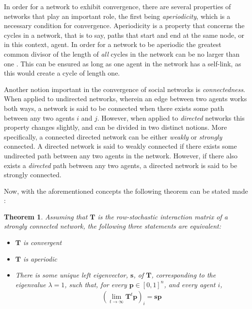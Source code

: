 \documentclass[a4paper, 12pt]{report}
\newtheorem{theorem}{Theorem}
\newcommand{\T}{\bm{T}}
\begin{document}
\noindent In order for a network to exhibit convergence, there are several properties of networks that play an important role, the first being \emph{aperiodicity}, which is a necessary condition for convergence. Aperiodicity is a property that concerns the cycles in a network, that is to say, paths that start and end at the same node, or in this context, agent. In order for a network to be aperiodic the greatest common divisor of the length of \emph{all} cycles in the network can be no larger than one \parencite{degroot1974concensus}. This can be ensured as long as one agent in the network has a self-link, as this would create a cycle of length one.

\noindent Another notion important in the convergence of social networks is \emph{connectedness}. When applied to undirected networks, wherein an edge between two agents works both ways, a network is said to be connected when there exists some path between any two agents $i$ and $j$. However, when applied to \emph{directed} networks this property changes slightly, and can be divided in two distinct notions. More specifically, a connected directed network can be either \emph{weakly} or \emph{strongly} connected. A directed network is said to weakly connected if there exists some undirected path between any two agents in the network. However, if there also exists a \emph{directed} path between any two agents, a directed network is said to be strongly connected.

\noindent Now, with the aforementioned concepts the following theorem can be stated made \parencite{degroot1974concensus}:

\begin{theorem}
\noindent Assuming that $\T$ is the row-stochastic interaction matrix of a strongly connected network, the following three statements are equivalent:
\begin{itemize}
    \item[-] $\T$ is convergent
    \item[-] $\T$ is aperiodic
    \item[-] There is some unique left eigenvector, $\bm{s}$, of $\T$, corresponding to the eigenvalue $\lambda=1$, such that, for every $\bm{p}\in [0,1]^n$, and every agent $i$,
    \begin{align*}
        (\lim_{t\to\infty}\T^t\bm{p})_i = \bm{sp}
    \end{align*}
\end{itemize}
\end{theorem}
\end{document}

